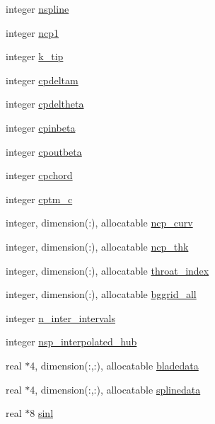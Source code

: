 \begin{DoxyCompactItemize}
\item 
integer \hyperlink{namespaceglobvar_a7e351eabe5e835869229e46300647b6f}{nspline}
\item 
integer \hyperlink{namespaceglobvar_aa5e3baef2345be01a1a377da45671712}{ncp1}
\item 
integer \hyperlink{namespaceglobvar_a2132ac685f6964bb8749df5018e28dec}{k\+\_\+tip}
\item 
integer \hyperlink{namespaceglobvar_a30666fa979088a7b9518a10063cd3ec6}{cpdeltam}
\item 
integer \hyperlink{namespaceglobvar_a4ec3f324cc8dbfe8e5a71b25b9df4227}{cpdeltheta}
\item 
integer \hyperlink{namespaceglobvar_ab36694d6866f8a68163d4475a325ae7c}{cpinbeta}
\item 
integer \hyperlink{namespaceglobvar_a65a328c5bd187b50f70674225e880191}{cpoutbeta}
\item 
integer \hyperlink{namespaceglobvar_a23b2b2fc255df014f0e8b7ab565c4001}{cpchord}
\item 
integer \hyperlink{namespaceglobvar_ae33599a3354a040c2dbac01b154afc1f}{cptm\+\_\+c}
\item 
integer, dimension(\+:), allocatable \hyperlink{namespaceglobvar_a4b18ca71c05db91ed78552377e4e0aa4}{ncp\+\_\+curv}
\item 
integer, dimension(\+:), allocatable \hyperlink{namespaceglobvar_ac94874cf7f449d0711f2b40bce778862}{ncp\+\_\+thk}
\item 
integer, dimension(\+:), allocatable \hyperlink{namespaceglobvar_a63d910cfc844949f7d789af4f16e6695}{throat\+\_\+index}
\item 
integer, dimension(\+:), allocatable \hyperlink{namespaceglobvar_a62db14137ca5f48f595e1008d33688ab}{bggrid\+\_\+all}
\item 
integer \hyperlink{namespaceglobvar_ab00be7b1445612bf4318ec5e6f4ccce5}{n\+\_\+inter\+\_\+intervals}
\item 
integer \hyperlink{namespaceglobvar_ae37107e062abef0f5d095fbb2691aa3b}{nsp\+\_\+interpolated\+\_\+hub}
\item 
real $\ast$4, dimension(\+:,\+:), allocatable \hyperlink{namespaceglobvar_a19f797343d8c12180411f1e3f50c5209}{bladedata}
\item 
real $\ast$4, dimension(\+:,\+:), allocatable \hyperlink{namespaceglobvar_ae19ac4fbce29d3ec8bdd4a274023361f}{splinedata}
\item 
real $\ast$8 \hyperlink{namespaceglobvar_a9ed7026c367a81340ec32f8feac5d8b9}{sinl}
\item 

\end{DoxyCompactItemize}

